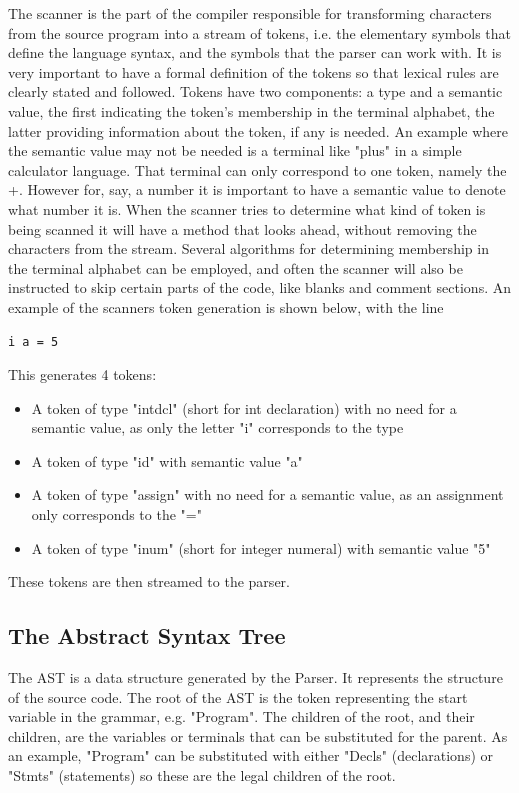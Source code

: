 The scanner is the part of the compiler responsible for transforming characters from the source program into a stream of tokens, i.e. the elementary symbols that define the language syntax, and the symbols that the parser can work with.
It is very important to have a formal definition of the tokens so that lexical rules are clearly stated and followed.
Tokens have two components: a type and a semantic value, the first indicating the token's membership in the terminal alphabet, the latter providing information about the token, if any is needed.
An example where the semantic value may not be needed is a terminal like "plus" in a simple calculator language. That terminal can only correspond to one token, namely the +. However for, say, a number it is important to have a semantic value to denote what number it is.
When the scanner tries to determine what kind of token is being scanned it will have a method that looks ahead, without removing the characters from the stream. Several algorithms for determining membership in the terminal alphabet can be employed, and often the scanner will also be instructed to skip certain parts of the code, like blanks and comment sections.
An example of the scanners token generation is shown below, with the line
\begin{lstlisting}
i a = 5
\end{lstlisting}

This generates 4 tokens: 
\begin{itemize}
\item A token of type "intdcl" (short for int declaration) with no need for a semantic value, as only the letter "i" corresponds to the type 
\item A token of type "id" with semantic value "a" 
\item A token of type "assign" with no need for a semantic value, as an assignment only corresponds to the "="
\item A token of type "inum" (short for integer numeral) with semantic value "5"
\end{itemize}

These tokens are then streamed to the parser.

\subsection{The Abstract Syntax Tree}
The AST is a data structure generated by the Parser. It represents the structure of the source code. The root of the AST is the token representing the start variable in the grammar, e.g. "Program". The children of the root, and their children, are the variables or terminals that can be substituted for the parent. As an example, "Program" can be substituted with either "Decls" (declarations) or "Stmts" (statements) so these are the legal children of the root. 

